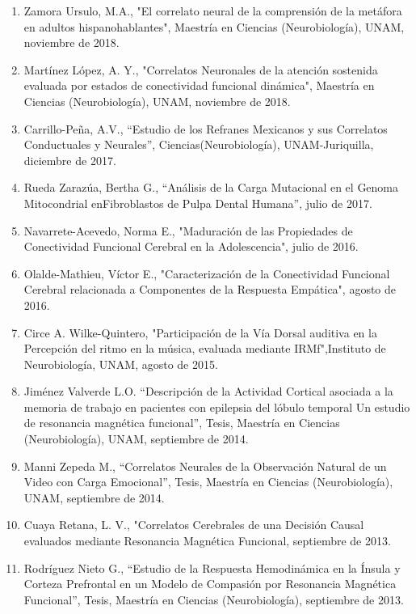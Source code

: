 \begin{enumerate}
\item Zamora Ursulo, M.A., "El correlato neural de la comprensión de la metáfora en adultos hispanohablantes", Maestría en 
Ciencias (Neurobiología), UNAM, noviembre de 2018.

\item Martínez López, A. Y., "Correlatos Neuronales de la atención sostenida evaluada por estados de conectividad funcional 
dinámica", Maestría en Ciencias (Neurobiología), UNAM, noviembre de 2018.

\item Carrillo-Peña, A.V., “Estudio de los Refranes Mexicanos y sus Correlatos Conductuales y Neurales”, 
Ciencias(Neurobiología), UNAM-Juriquilla, diciembre de 2017.

\item Rueda Zarazúa, Bertha G., “Análisis de la Carga Mutacional en el Genoma Mitocondrial enFibroblastos de Pulpa Dental 
Humana”, julio de 2017.

\item Navarrete-Acevedo, Norma E., "Maduración de las Propiedades de Conectividad Funcional Cerebral en la Adolescencia", julio de 2016.

\item Olalde-Mathieu, Víctor E., "Caracterización de la Conectividad Funcional Cerebral relacionada a Componentes de la 
Respuesta Empática", agosto de 2016.

\item Circe A. Wilke-Quintero, "Participación de la Vía Dorsal auditiva en la Percepción del ritmo en la música, evaluada 
mediante IRMf",Instituto de Neurobiología, UNAM, agosto de 2015.

\item Jiménez Valverde L.O. “Descripción de la Actividad Cortical asociada a la memoria de trabajo en pacientes con 
epilepsia 
del lóbulo temporal Un estudio de resonancia magnética funcional”, Tesis, Maestría en Ciencias (Neurobiología), UNAM, 
septiembre de 2014.

\item Manni Zepeda M., “Correlatos Neurales de la Observación Natural de un Video con Carga Emocional”, Tesis, Maestría en 
Ciencias (Neurobiología), UNAM, septiembre de 2014.

\item Cuaya Retana, L. V., "Correlatos Cerebrales de una Decisión Causal evaluados mediante Resonancia Magnética Funcional, 
septiembre de 2013.

\item Rodríguez Nieto G., “Estudio de la Respuesta Hemodinámica en la Ínsula y Corteza Prefrontal en un Modelo de Compasión 
por Resonancia Magnética Funcional”, Tesis, Maestría en Ciencias (Neurobiología), septiembre de 2013.


\end{enumerate}
